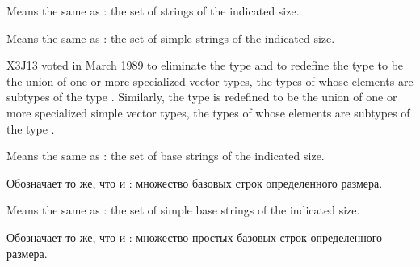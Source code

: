 \begin{obsolete}
\begin{flushdesc}
\item[\cd{(string \textit{size})}]
Means the same as
: the set of strings of the indicated size.

\item[\cd{(simple-string \textit{size})}]
Means the same
as : the set of simple
strings of the indicated size.
\end{flushdesc}
\end{obsolete}

\begin{newer}
X3J13 voted in March 1989 
to eliminate the type  and to redefine the type
 to be the union of one or more specialized vector
types, the types of whose elements are subtypes of the type .
Similarly, the type
 is redefined to be the union of one or more specialized
simple vector
types, the types of whose elements are subtypes of the type .

\begin{flushdesc}
\item[\cd{(base-string \textit{size})}]
Means the same as
: the set of base
strings of the indicated size.


\item[\cd{(base-string \textit{размер})}]
Обозначает то же, что и : множество
базовых строк определенного размера.


\item[\cd{(simple-base-string \textit{size})}]
Means the same
as : the set of simple base
strings of the indicated size.

\item[\cd{(simple-base-string \textit{размер})}]
Обозначает то же, что и : множество
простых базовых строк определенного размера.
\end{flushdesc}
\end{newer}

